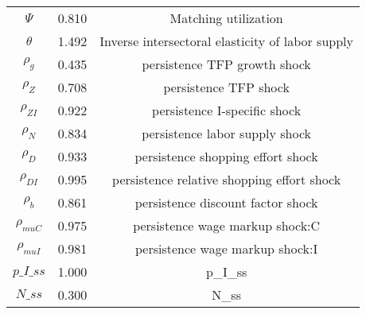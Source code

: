 \begin{center}
\begin{longtable}{ccc}
${\Psi}$ 	 & 	 0.810 	 & 	 Matching utilization\\
${\theta}$ 	 & 	 1.492 	 & 	 Inverse intersectoral elasticity of labor supply\\
${\rho_g}$ 	 & 	 0.435 	 & 	 persistence TFP growth shock\\
${\rho_Z}$ 	 & 	 0.708 	 & 	 persistence TFP shock\\
${\rho_{ZI}}$ 	 & 	 0.922 	 & 	 persistence I-specific shock\\
${\rho_N}$ 	 & 	 0.834 	 & 	 persistence labor supply shock\\
${\rho_D}$ 	 & 	 0.933 	 & 	 persistence shopping effort shock\\
${\rho_{DI}}$ 	 & 	 0.995 	 & 	 persistence relative shopping effort shock\\
${\rho_b}$ 	 & 	 0.861 	 & 	 persistence discount factor shock\\
${\rho_{muC}}$ 	 & 	 0.975 	 & 	 persistence wage markup shock:C\\
${\rho_{muI}}$ 	 & 	 0.981 	 & 	 persistence wage markup shock:I\\
$p\_I\_ss$ 	 & 	 1.000 	 & 	 p\_I\_ss\\
$N\_ss$ 	 & 	 0.300 	 & 	 N\_ss\\
\bottomrule%
\end{longtable}
\end{center}
